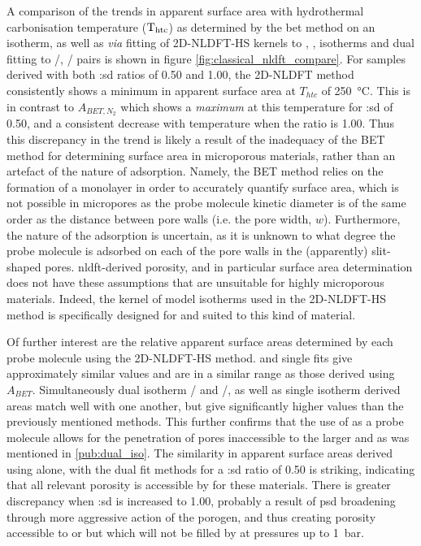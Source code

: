 A comparison of the trends in apparent surface area with hydrothermal carbonisation temperature ($\rm T_{htc}$) as determined by the \acrshort{bet} method on an  isotherm,\citep{Brunauer1938Adsorption} as well as \textit{via} fitting of 2D-NLDFT-HS kernels to , ,  isotherms and dual fitting to /, / pairs is shown in figure \ref{fig:classical_nldft_compare}. For samples derived with both :\acrshort{sd} ratios of 0.50 and 1.00, the 2D-NLDFT method consistently shows a minimum in apparent surface area at $T_{htc}$ of \qty{250}{\degreeCelsius}. This is in contrast to $A_{BET,N_2}$ which shows a \textit{maximum} at this temperature for :\acrshort{sd} of 0.50, and a consistent decrease with temperature when the ratio is 1.00. Thus this discrepancy in the trend is likely a result of the inadequacy of the BET method for determining surface area in microporous materials, rather than an artefact of the nature of  \gls{adsorption}. Namely, the BET method relies on the formation of a monolayer in order to accurately quantify surface area, which is not possible in \glspl{micropore} as the probe molecule kinetic diameter is of the same order as the distance between pore walls (i.e. the pore width, $w$).\citep{Rouquerol2007Is, coasne2004grand, ambroz2018evaluation, walton2007applicability} Furthermore, the nature of the \gls{adsorption} is uncertain, as it is unknown to what degree the probe molecule is adsorbed on each of the pore walls in the (apparently) slit-shaped pores.\citep{Rouquerol2007Is, Brunauer1938Adsorption} \acrshort{nldft}-derived porosity, and in particular surface area determination does not have these assumptions that are unsuitable for highly microporous materials. Indeed, the kernel of model isotherms used in the 2D-NLDFT-HS method\citep{Jagiello20132D} is specifically designed for and suited to this kind of material. 

Of further interest are the relative apparent surface areas determined by each probe molecule using the 2D-NLDFT-HS method.  and  single fits give approximately similar values and are in a similar range as those derived using $A_{BET}$. Simultaneously dual isotherm / and /, as well as single isotherm  derived areas match well with one another, but give significantly higher values than the previously mentioned methods. This further confirms that the use of  as a probe molecule allows for the penetration of pores inaccessible to the larger  and  as was mentioned in \ref{pub:dual_iso}. The similarity in apparent surface areas derived using  alone, with the dual fit methods for a :\acrshort{sd} ratio of 0.50 is striking, indicating that all relevant porosity is accessible by  for these materials. There is greater discrepancy when :\acrshort{sd} is increased to 1.00, probably a result of \acrshort{psd} broadening through more aggressive action of the \gls{porogen}, and thus creating porosity accessible to  or  but which will not be filled by  at pressures up to \qty{1}{\bar}.

